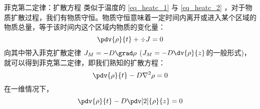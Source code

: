 \begin{example}{菲克第二定律：扩散方程}
类似于温度的 \autoref{eq_heatc_1} 与 \autoref{eq_heatc_2} ，对于物质扩散过程，我们有物质守恒。物质守恒意味着一定时间内离开或进入某个区域的物质总量，等于该时间内这个区域内物质的变化量：
\begin{equation}
\pdv{\rho}{t} + \div J = 0
\end{equation}
向其中带入菲克扩散定律 $J_M=-D \grad \rho$ ($J_M=-D \dv{\rho}{z}$的一般形式)，就可以得到菲克第二定律，即我们熟知的扩散方程：
\begin{equation}
\pdv{\rho}{t} - D \nabla^2 \rho = 0
\end{equation}
在一维情况下，
\begin{equation}
\pdv{\rho}{t} - D \pdv[2]{\rho}{z} = 0
\end{equation}
\end{example}

